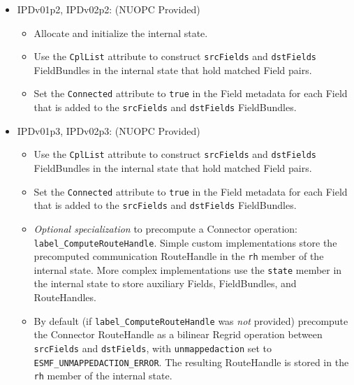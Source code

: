 \begin{itemize}
\begin{itemize}
  \end{itemize}
\item IPDv01p2, IPDv02p2: ({\sc NUOPC Provided})
  \begin{itemize}
  \item Allocate and initialize the internal state.
  \item Use the {\tt CplList} attribute to construct {\tt srcFields} and {\tt dstFields} FieldBundles in the internal state that hold matched Field pairs.
  \item Set the {\tt Connected} attribute to {\tt true} in the Field metadata for each Field that is added to the {\tt srcFields} and {\tt dstFields} FieldBundles.
  \end{itemize}  
\item IPDv01p3, IPDv02p3: ({\sc NUOPC Provided})
  \begin{itemize}
  \item Use the {\tt CplList} attribute to construct {\tt srcFields} and {\tt dstFields} FieldBundles in the internal state that hold matched Field pairs.
  \item Set the {\tt Connected} attribute to {\tt true} in the Field metadata for each Field that is added to the {\tt srcFields} and {\tt dstFields} FieldBundles.
  \item {\it Optional specialization} to precompute a Connector operation: {\tt label\_ComputeRouteHandle}. Simple custom implementations store the precomputed communication RouteHandle in the {\tt rh} member of the internal state. More complex implementations use the {\tt state} member in the internal state to store auxiliary Fields, FieldBundles, and RouteHandles.
  \item By default (if {\tt label\_ComputeRouteHandle} was {\em not} provided) precompute the Connector RouteHandle as a bilinear Regrid operation between {\tt srcFields} and {\tt dstFields}, with {\tt unmappedaction} set to {\tt ESMF\_UNMAPPEDACTION\_ERROR}. The resulting RouteHandle is stored in the {\tt rh} member of the internal state.
  \end{itemize}  
\end{itemize}

